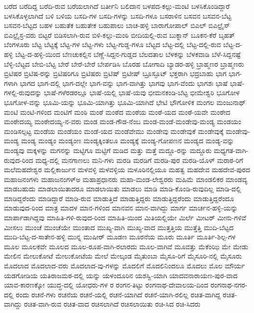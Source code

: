 {ಬರೆದ
ಬರೆದಿದ್ದ
ಬರೆದಿ-ರುವ
ಬರೆಯಲಾಗಿದೆ
ಬರ್ತೀನಿ
ಬಲಿದಾನ
ಬಳಪದ-ಕಲ್ಲು-ಮಂಟಿ
ಬಳಸಿಕೊಂಡಿದ್ದಾರೆ
ಬಳಸಿಕೊಳ್ಳಲಾಗಿದೆ
ಬಳಿ
ಬಳಿಯ
ಬಸದಿ-ಗಳ
ಬಸದಿ-ಗಳನ್ನು
ಬಸದಿ-ಗಳೂ
ಬಸರಾಳಿನ
ಬಸವನ
ಬಸವನ-ಬೆಟ್ಟ
ಬಸವನ-ಬೆಟ್ಟದ
ಬಹಳ
ಬಹುತೆಕ
ಬಹುತೇಕ
ಬಹುಪಾಲು
ಬಾಚ-ಹಳ್ಳಿ
ಬಾರಾಗೋಪಾಲ್
ಬಿಎಲ್
ಬಿಎಲ್ರೈಸ್
ಬಿಎಲ್ರೈಸ್ರ-ವರು
ಬಿಟ್ಟರೆ
ಬಿಡಿಸಲಾಗಿ-ರುವ
ಬಿಳಿ-ಕಲ್ಲು-ಮಂಠಿ
ಬೀದಿಯಲ್ಲಿ-ರುವ
ಬುಕ್ನಾನ್
ಬೂಕನ-ಕೆರೆ
ಬೃಹತ್
ಬೆಂಗಳೂರು
ಬೆಟ್ಟ
ಬೆಟ್ಟಕ್ಕೆ
ಬೆಟ್ಟ-ಗಳ
ಬೆಟ್ಟ-ಗಳು
ಬೆಟ್ಟ-ಗುಡ್ಡ-ಗಳೂ
ಬೆಟ್ಟದ
ಬೆಟ್ಟ-ದಲ್ಲಿ
ಬೆಟ್ಟ-ದಲ್ಲಿ-ರುವ
ಬೆಟ್ಟ-ದ-ಹಳ್ಳಿ
ಬೆಟ್ಟ-ದ-ಹಳ್ಳಿ-ಯಿಂದ
ಬೆಣಚುಕಲ್ಲಿನ
ಬೆಣ್ಣೆ-ಸಿದ್ದನ-ಗುಡ್ಡದ
ಬೆಲದತಾಲ
ಬೆಳಕನ್ನು
ಬೆಳಕವಾಡಿ
ಬೆಳೆ-ಸಿದ್ದನಷ್ಟೆ
ಬೆಳ್ಳಿ-ಬೆಟ್ಟದ
ಬೇಬಿ-ಬೆಟ್ಟ
ಬೇರೆ
ಬೇರೆ-ಬೇರೆ
ಬೇರ್ಪಡಿಸಿ
ಬೊರಹ
ಬೋಗಾದಿ
ಬ್ಯಾಡರ-ಹಳ್ಳಿ
ಬ್ರಾಹ್ಮಣರ
ಬ್ರಾಹ್ಮಣರು
ಬ್ರಿಟಿಷರ
ಬ್ರಿಟಿಷ-ರನ್ನು
ಬ್ರಿಟಿಷರಿಗೂ
ಬ್ರಿಟಿಷರು
ಬ್ರಿಟಿಷ್
ಬ್ರಿಟೀಷ್
ಬ್ರೂಸ್ಫೂಟ್
ಭಕ್ತರಾಗಿ
ಭದ್ರಬಾಹು
ಭಾಗ
ಭಾಗ-ಗಳಾಗಿ
ಭಾಗದ
ಭಾಗ-ದಲ್ಲಿ
ಭಾಗ-ದಲ್ಲೇ
ಭಾಗ-ವನ್ನು
ಭಾಗ-ವಾಗಿತ್ತು
ಭಾಗವು
ಭಾಗ-ವೆಂದು
ಭಾಗಶಃ
ಭಾಷೆ
ಭಾಷೆ-ಗಳಲ್ಲಿ-ರುವುದನ್ನು
ಭಾಷೆ-ಗಳೆರಡರಲ್ಲೂ
ಭಾಷೆ-ಯಲ್ಲಿ
ಭಾಷೆ-ಯವು
ಭೀಮನಕಂಡಿ-ಬೆಟ್ಟ
ಭೀಮೇಶ್ವರಿ
ಭೂಗೋಳ
ಭೂಗೋಳ-ವನ್ನು
ಭೂಮಿ-ಯನ್ನು
ಭೂಮಿ-ಯಾಗಿತ್ತು
ಭೂಮಿ-ಯಾಗಿದೆ
ಭೇಟಿ
ಭೌಗೋಳಿಕ
ಮಂಗಲ
ಮಂಜುನಾಥ್
ಮಂಟಿ
ಮಂಟಿ-ಗಳಿಂದ
ಮಂಟಿಗೆ
ಮಂಠಿ
ಮಂಠೆ
ಮಂಠೆದ
ಮಂಠೆಯ
ಮಂಠೆ-ಯದ
ಮಂಠೆ-ಯವೇ
ಮಂಠೇದ
ಮಂಠೇದಯ್ಯ
ಮಂಠೇದಯ್ಯ-ನ-ವರು
ಮಂಡ
ಮಂಡ-ಗೌಡ-ನೆಂಬ
ಮಂಡ-ಮಂಡೆ-ಮಂಡೇವು-ಮಂಡ್ಯ
ಮಂಡಯಂ
ಮಂಡಿಸಲ್ಪಟ್ಟ
ಮಂಡೆಯ
ಮಂಡೆಯಂ
ಮಂಡೆ-ಯದ
ಮಂಡೆವೇಮು
ಮಂಡೇವು
ಮಂಡೇವುಕೆ
ಮಂಡೇವುಕ್ಕೆ
ಮಂಡೇವು-ಮಂಡ್ಯ
ಮಂಡ್ಯ
ಮಂಡ್ಯಂ
ಮಂಡ್ಯಂಣ
ಮಂಡ್ಯಕ್ಕಿಂತಲೂ
ಮಂಡ್ಯಕ್ಕೆ
ಮಂಡ್ಯ-ಗೋಪಣನ
ಮಂಡ್ಯದ
ಮಂಡ್ಯ-ವನ್ನು
ಮಂಡ್ಯವು
ಮಕ್ಕಳನ್ನು
ಮಗನನ್ನು
ಮಟ್ಟಿಗೂ
ಮಟ್ಟಿಗೆ
ಮಡಿದ
ಮತ್ತು
ಮತ್ತೆ
ಮದ್ದೂ-ರನ್ನು
ಮದ್ದೂರು
ಮಧ್ಯಗತ-ವಾಗಿ-ರುವುದ-ರಿಂದ
ಮಧ್ಯ-ದಲ್ಲಿ
ಮನಗಾಣಲು
ಮನಿ-ಗಳು
ಮರಡಿ
ಮರಡಿಗೆ
ಮರಡಿ-ಪುರ
ಮರಡಿ-ಯೊಳ್
ಮರಾಠ-ರಿಗೆ
ಮಲೆಮಹದೇಶ್ವರ
ಮಲ್ಲಿಕಾರ್ಜುನ
ಮಳವಳ್ಳಿ
ಮಳವಳ್ಳಿಯ
ಮಳೂರಿನಲ್ಲಿಯೂ
ಮಹತ್ವ
ಮಹದೇವ
ಮಹದೇವ-ಪುರದ
ಮಹಾಜನಂಗಳು
ಮಹಾಜನಂಗಳ್ಅ
ಮಹಾಪ್ರಧಾನರು
ಮಹಾ-ಮಂಡ-ಲೇಶ್ವರರು
ಮಹಿಮೆ
ಮಾಂಡಲಿಕರ
ಮಾಂಡವ್ಯ
ಮಾಡಬಹುದು
ಮಾಡಲಾಯಿತಾದರೂ
ಮಾಡಲಾಯಿತು
ಮಾಡಲು
ಮಾಡಿ
ಮಾಡಿ-ಕೊಂಡಿ-ರುವುದಿಲ್ಲ
ಮಾಡಿ-ದಲ್ಲಿ
ಮಾಡಿದ್ದರೆಂದು
ಮಾಡಿದ್ದಾರೆ
ಮಾಡಿ-ರುವ
ಮಾಡುತ್ತಿದೆ
ಮಾಡುತ್ತಿದ್ದರು
ಮಾಡುತ್ತಿದ್ದರೆಂದು
ಮಾಡುತ್ತಿದ್ದರೆಂದೂ
ಮಾಡುವುದ-ರಿಂದ
ಮಾತ್ರ
ಮಾದಳ
ಮಾನ-ಗಳಿಂದ
ಮಾನವನ
ಮಾನ-ವಾಗಿದ್ದು
ಮಾರ್ಗ
ಮಾರ್ಚನ-ಹಳ್ಳಿ-ಯನ್ನು
ಮಾರ್ಪಾಡಾಗಿದ್ದವು
ಮಾಹಿತಿ-ಗಳಿ-ರುವುದ-ರಿಂದ
ಮಾಹಿತಿ-ಯಿಂದ
ಮಿತಿಯಲ್ಲಿಯೇ
ಮಿರ್ಲೆ
ಮೀಟರ್
ಮೀನು-ಗಳಿವೆ
ಮೀಸಲು
ಮುಂಚೆ
ಮುಂಚೆಯೇ
ಮುಂತಾದ
ಮುಖ್ಯ-ವಾಗಿ
ಮುಖ್ಯ-ವಾದ
ಮುತ್ತತ್ತಿಯ
ಮುತ್ತೆತ್ತಿ
ಮುದಿ-ಬೆಟ್ಟದ
ಮುದಿ-ಬೆಟ್ಟ-ದ-ಸಾತೇನ-ಹಳ್ಳಿ
ಮುನ್ನ
ಮುಷೀರ್
ಮೂಡಣ
ಮೂರನೆಯ
ಮೂರು
ಮೂರ್ತಿ
ಮೂರ್ತಿ-ಶಿಲ್ಪ-ಗಳ
ಮೂಲ
ಮೂಲಕವೇ
ಮೂಲದ
ಮೂಲ-ರೂಪ-ವಾಗಿ-ರಲಾರದು
ಮೂಲ-ವಾಗಿವೆ
ಮೂವತ್ತು
ಮೆಕೆಂಝಿ
ಮೇ
ಮೇಡು
ಮೇಲಿನ
ಮೇಲುಕೋಟೆ
ಮೇಲುಕೋಟೆಯ
ಮೇಲೆ
ಮೇಲ್ಕಂಡ
ಮೈತುಂಬಾ
ಮೈಸೂ-ರಿಗೆ
ಮೈಸೂರಿ-ನಲ್ಲಿ
ಮೈಸೂರು
ಮೊದಲಾದ
ಮೊದಲಾದ-ವರು
ಮೊದಲಾದ-ವು-ಗಳನ್ನು
ಮೊದಲಿಗೆ
ಮೊದಲಿನಿಂದಲೂ
ಮೊದಲು
ಮೊಲ
ಮೌರ್ಯ
ಯಡಗೋಡಿಯ
ಯತಿರಾಜಮಠ-ದಲ್ಲಿ
ಯನ್ನು
ಯಳಂದೂರಿನ
ಯಶಸ್ವಿ-ಯಾಗಿ
ಯಾದವನಾರಾಯಣ-ಪುರ-ವಾದ
ಯಾವ-ಕಾರಣಕ್ಕೋ
ಯುದ್ಧ-ದಲ್ಲಿ
ಯೋಧರು-ಗಳ
ರ
ರಂಗನ-ತಿಟ್ಟು
ರಂಗನಾಥ-ದೇವಾಲಯ-ದಿಂದ
ರಂಗನಾಥ-ನಗರ-ದಲ್ಲಿ
ರಂದು
ರಚನೆ-ಗಳು
ರಚನೆಯ
ರಚನೆ-ಯಲ್ಲಿ
ರಚನೆ-ಯಾಗಿದೆ
ರಚನೆ-ಯಾಗಿ-ರಲಿಲ್ಲ
ರಚಿತ-ವಾಗಿದ್ದ
ರಚಿತ-ವಾಗಿದ್ದು
ರಚಿತ-ವಾಗಿ-ರುವ
ರಚಿತ-ವಾದ
ರಚಿಸಲಾಗಿದೆ
ರಚಿಸಲಾಯಿತು
ರಚಿ-ಸಿದ
ರಚಿ-ಸಿದರು
}
